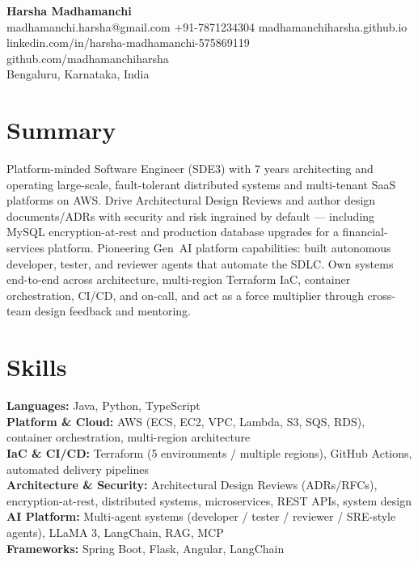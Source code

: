 \documentclass[11pt,a4paper]{article}
\begin{document}
\begin{center}
    {\LARGE\bfseries\color{primary} Harsha Madhamanchi}\\[-4pt]
    \small
    madhamanchi.harsha@gmail.com \quad
    +91-7871234304 \quad
    \textcolor{primary}{madhamanchiharsha.github.io} \\[2pt]
    \textcolor{primary}{linkedin.com/in/harsha-madhamanchi-575869119} \quad
    \textcolor{primary}{github.com/madhamanchiharsha} \\[2pt]
    Bengaluru, Karnataka, India
\end{center}

\vspace{-4pt}
\section{Summary}
\noindent
Platform-minded Software Engineer (SDE3) with 7 years architecting and operating large-scale, fault-tolerant distributed systems and multi-tenant SaaS platforms on AWS. Drive Architectural Design Reviews and author design documents/ADRs with security and risk ingrained by default --- including MySQL encryption-at-rest and production database upgrades for a financial-services platform. Pioneering Gen~AI platform capabilities: built autonomous developer, tester, and reviewer agents that automate the SDLC. Own systems end-to-end across architecture, multi-region Terraform IaC, container orchestration, CI/CD, and on-call, and act as a force multiplier through cross-team design feedback and mentoring.

\section{Skills}
\noindent\textbf{Languages:} Java, Python, TypeScript \\
\textbf{Platform \& Cloud:} AWS (ECS, EC2, VPC, Lambda, S3, SQS, RDS), container orchestration, multi-region architecture \\
\textbf{IaC \& CI/CD:} Terraform (5 environments / multiple regions), GitHub Actions, automated delivery pipelines \\
\textbf{Architecture \& Security:} Architectural Design Reviews (ADRs/RFCs), encryption-at-rest, distributed systems, microservices, REST APIs, system design \\
\textbf{AI Platform:} Multi-agent systems (developer / tester / reviewer / SRE-style agents), LLaMA 3, LangChain, RAG, MCP \\
\textbf{Frameworks:} Spring Boot, Flask, Angular, LangChain
\end{document}
